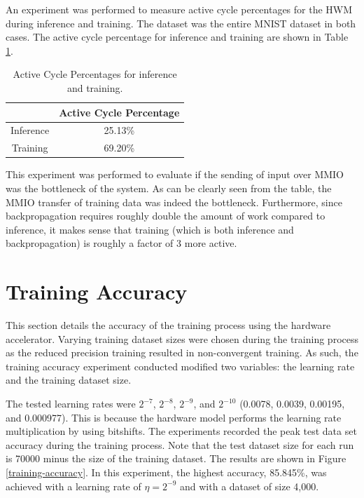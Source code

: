An experiment was performed to measure active cycle percentages for the HWM during inference and training. The dataset was the entire MNIST dataset in both cases. The active cycle percentage for inference and training are shown in Table \ref{active-cycle-table}.

\begin{table}
	\centering 
	\begin{tabular}{|c|c|}
		\hline
		& \textbf{Active Cycle Percentage} \\\hline
		Inference & 25.13\% \\\hline 
		Training & 69.20\% \\\hline
	\end{tabular}
	\caption{Active Cycle Percentages for inference and training.}
	\label{active-cycle-table}
\end{table}

This experiment was performed to evaluate if the sending of input over MMIO was the bottleneck of the system. As can be clearly seen from the table, the MMIO transfer of training data was indeed the bottleneck. Furthermore, since backpropagation requires roughly double the amount of work compared to inference, it makes sense that training (which is both inference and backpropagation) is roughly a factor of 3 more active.

\section{Training Accuracy}
This section details the accuracy of the training process using the hardware accelerator. Varying training dataset sizes were chosen during the training process as the reduced precision training resulted in non-convergent training. As such, the training accuracy experiment conducted modified two variables: the learning rate and the training dataset size. 

The tested learning rates were $2^{-7}$, $2^{-8}$, $2^{-9}$, and $2^{-10}$ (0.0078, 0.0039, 0.00195, and 0.000977). This is because the hardware model performs the learning rate multiplication by using bitshifts. The experiments recorded the peak test data set accuracy during the training process. Note that the test dataset size for each run is 70000 minus the size of the training dataset. The results are shown in Figure \ref{training-accuracy}. In this experiment, the highest accuracy, 85.845\%, was achieved with a learning rate of $\eta = 2^{-9}$ and with a dataset of size 4,000.


